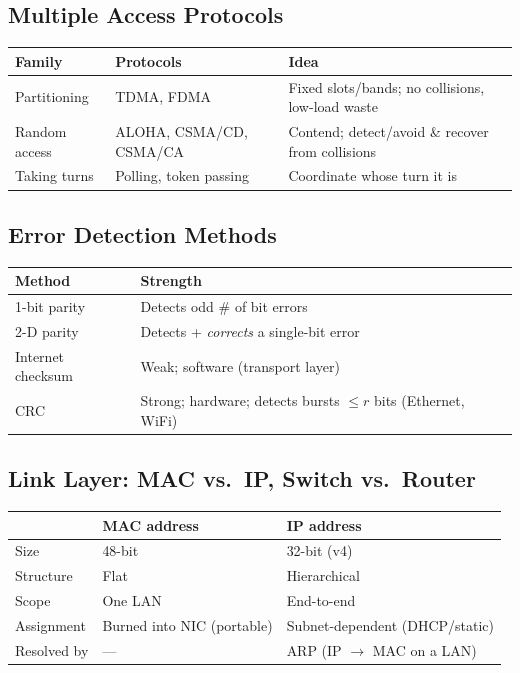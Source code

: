 \documentclass[hidelinks]{article}
\begin{document}
\subsection{Multiple Access Protocols}

\noindent\begin{tabularx}{\textwidth}{|l|X|X|}
\hline
\textbf{Family} & \textbf{Protocols} & \textbf{Idea} \\
\hline
Partitioning & TDMA, FDMA & Fixed slots/bands; no collisions, low-load waste \\
\hline
Random access & ALOHA, CSMA/CD, CSMA/CA & Contend; detect/avoid \& recover from collisions \\
\hline
Taking turns & Polling, token passing & Coordinate whose turn it is \\
\hline
\end{tabularx}

\subsection{Error Detection Methods}

\noindent\begin{tabularx}{\textwidth}{|l|X|}
\hline
\textbf{Method} & \textbf{Strength} \\
\hline
1-bit parity & Detects odd \# of bit errors \\
\hline
2-D parity & Detects + \emph{corrects} a single-bit error \\
\hline
Internet checksum & Weak; software (transport layer) \\
\hline
CRC & Strong; hardware; detects bursts $\leq r$ bits (Ethernet, WiFi) \\
\hline
\end{tabularx}

\subsection{Link Layer: MAC vs.\ IP, Switch vs.\ Router}

\noindent\begin{tabularx}{\textwidth}{|l|X|X|}
\hline
 & \textbf{MAC address} & \textbf{IP address} \\
\hline
Size & 48-bit & 32-bit (v4) \\
\hline
Structure & Flat & Hierarchical \\
\hline
Scope & One LAN & End-to-end \\
\hline
Assignment & Burned into NIC (portable) & Subnet-dependent (DHCP/static) \\
\hline
Resolved by & --- & ARP (IP $\to$ MAC on a LAN) \\
\hline
\end{tabularx}
\end{document}
